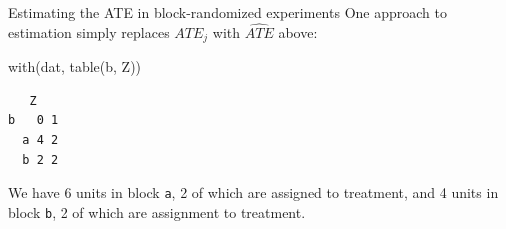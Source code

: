 \documentclass[
  ignorenonframetext,
]{beamer}
\newenvironment{Shaded}{\begin{snugshade}}{\end{snugshade}}
\newcommand{\FunctionTok}[1]{\textcolor[rgb]{0.00,0.00,0.00}{#1}}
\newcommand{\NormalTok}[1]{#1}
\begin{document}
\begin{frame}[fragile]{Estimating the ATE in block-randomized
experiments}
\protect\hypertarget{estimating-the-ate-in-block-randomized-experiments}{}
One approach to estimation simply replaces \(ATE_j\) with
\(\widehat{ATE}\) above:

\scriptsize

\begin{Shaded}
\begin{Highlighting}[]
\FunctionTok{with}\NormalTok{(dat, }\FunctionTok{table}\NormalTok{(b, Z))}
\end{Highlighting}
\end{Shaded}

\begin{verbatim}
   Z
b   0 1
  a 4 2
  b 2 2
\end{verbatim}

\normalsize

We have 6 units in block \texttt{a}, 2 of which are assigned to
treatment, and 4 units in block \texttt{b}, 2 of which are assignment to
treatment.
\end{frame}
\end{document}
